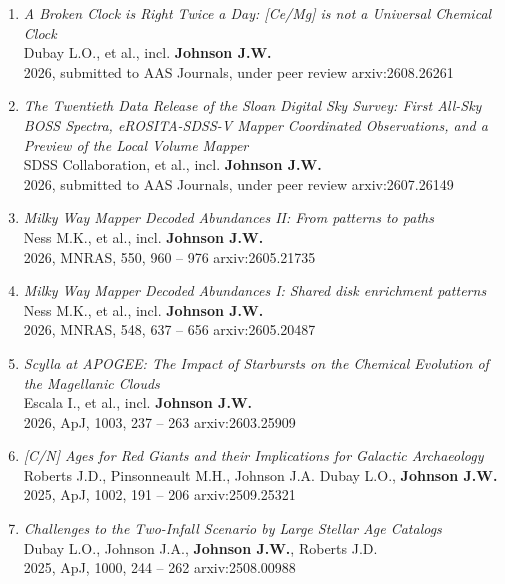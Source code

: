 \documentclass[cv.tex]{subfiles}
\begin{document}
\begin{enumerate}

	\vspace{-3mm}

	\item \textit{A Broken Clock is Right Twice a Day: [Ce/Mg] is not a
	Universal Chemical Clock}
	\\
	Dubay L.O., et al., incl. \textbf{Johnson J.W.}
	\\
	2026, submitted to AAS Journals, under peer review \hfill arxiv:2608.26261

	\item \textit{The Twentieth Data Release of the Sloan Digital Sky Survey:
	First All-Sky BOSS Spectra, eROSITA-SDSS-V Mapper Coordinated Observations,
	and a Preview of the Local Volume Mapper}
	\\
	SDSS Collaboration, et al., incl. \textbf{Johnson J.W.}
	\\
	2026, submitted to AAS Journals, under peer review \hfill arxiv:2607.26149

	\item \textit{Milky Way Mapper Decoded Abundances II: From patterns to paths}
	\\
	Ness M.K., et al., incl. \textbf{Johnson J.W.}
	\\
	2026, MNRAS, 550, 960 -- 976 \hfill arxiv:2605.21735

	\item \textit{Milky Way Mapper Decoded Abundances I: Shared disk enrichment
	patterns}
	\\
	Ness M.K., et al., incl. \textbf{Johnson J.W.}
	\\
	2026, MNRAS, 548, 637 -- 656 \hfill arxiv:2605.20487

	\item \textit{Scylla at APOGEE: The Impact of Starbursts on the Chemical
	Evolution of the Magellanic Clouds}
	\\
	Escala I., et al., incl. \textbf{Johnson J.W.}
	\\
	2026, ApJ, 1003, 237 -- 263 \hfill arxiv:2603.25909

	\item \textit{[C/N] Ages for Red Giants and their Implications for
	Galactic Archaeology}
	\\
	Roberts J.D., Pinsonneault M.H., Johnson J.A. Dubay L.O.,
	\textbf{Johnson J.W.}
	\\
	2025, ApJ, 1002, 191 -- 206 \hfill arxiv:2509.25321

	\item \textit{Challenges to the Two-Infall Scenario by Large Stellar Age Catalogs}
	\\
	Dubay L.O., Johnson J.A., \textbf{Johnson J.W.}, Roberts J.D.
	\\
	2025, ApJ, 1000, 244 -- 262 \hfill arxiv:2508.00988


\end{enumerate}
\end{document}
